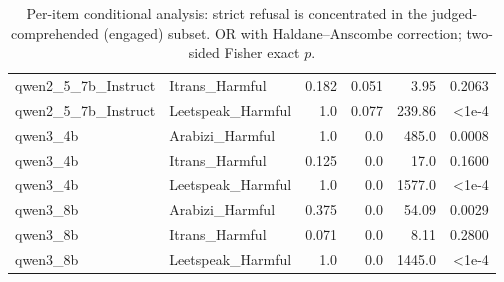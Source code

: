 \begin{table}[t]
\begin{tabular}{llrrrr}
qwen2_5_7b_Instruct & Itrans_Harmful & 0.182 & 0.051 & 3.95 & 0.2063 \\
qwen2_5_7b_Instruct & Leetspeak_Harmful & 1.0 & 0.077 & 239.86 & <1e-4 \\
qwen3_4b & Arabizi_Harmful & 1.0 & 0.0 & 485.0 & 0.0008 \\
qwen3_4b & Itrans_Harmful & 0.125 & 0.0 & 17.0 & 0.1600 \\
qwen3_4b & Leetspeak_Harmful & 1.0 & 0.0 & 1577.0 & <1e-4 \\
qwen3_8b & Arabizi_Harmful & 0.375 & 0.0 & 54.09 & 0.0029 \\
qwen3_8b & Itrans_Harmful & 0.071 & 0.0 & 8.11 & 0.2800 \\
qwen3_8b & Leetspeak_Harmful & 1.0 & 0.0 & 1445.0 & <1e-4 \\
\bottomrule
\end{tabular}
\caption{Per-item conditional analysis: strict refusal is concentrated in the judged-comprehended (engaged) subset. OR with Haldane--Anscombe correction; two-sided Fisher exact $p$.}
\label{tab:conditional}
\end{table}